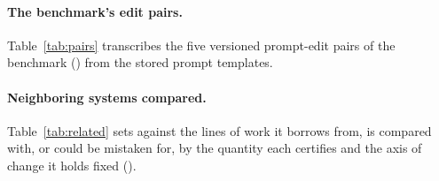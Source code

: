 \keeprunin
\paragraph{The benchmark's edit pairs.}
Table~\ref{tab:pairs} transcribes the five versioned prompt-edit pairs
of the benchmark () from the stored prompt
templates.

\keeprunin
\paragraph{Neighboring systems compared.}
Table~\ref{tab:related} sets \sivm{} against the lines of work it
borrows from, is compared with, or could be mistaken for, by the
quantity each certifies and the axis of change it holds fixed
().

\begin{table}[t]
\caption{Every model the article uses, by gateway identifier, with the
gateway's list prices as fetched on \priceFetchedAt.}
\label{tab:models}
\centering\footnotesize

\end{table}

\begin{table}[t]
\caption{Reconciliation of the flip-rate figures quoted for the
headline pair on the evaluation vector and for its cached-TRUE stratum.
Each is a different quantity, a different instrument on the same
quantity, or the same instrument on an earlier draw; none is a
restatement of another.}
\label{tab:rates}
\centering\footnotesize
\renewcommand{\arraystretch}{1.2}

\end{table}


